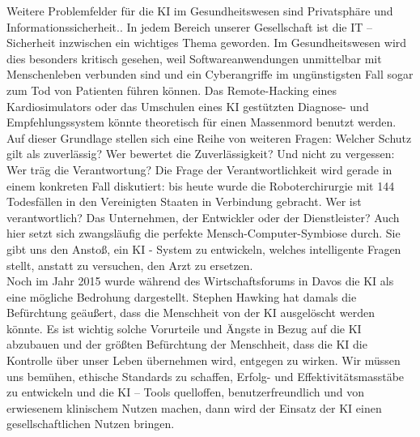 Weitere Problemfelder für die KI im Gesundheitswesen sind Privatsphäre und Informationssicherheit.\cite{Opportunities_challenges_ai_hc}. In jedem Bereich unserer Gesellschaft ist die IT – Sicherheit inzwischen ein wichtiges Thema geworden. Im Gesundheitswesen wird dies besonders kritisch gesehen, weil Softwareanwendungen unmittelbar mit Menschenleben verbunden sind und ein Cyberangriffe im ungünstigsten Fall sogar zum Tod von Patienten führen können. Das Remote-Hacking eines Kardiosimulators oder das Umschulen eines KI gestützten Diagnose- und Empfehlungssystem könnte theoretisch für einen Massenmord benutzt werden.\cite{Opportunities_challenges_ai_hc}\\ 
Auf dieser Grundlage stellen sich eine Reihe von weiteren Fragen: Welcher Schutz gilt als zuverlässig? Wer bewertet die Zuverlässigkeit? Und nicht zu vergessen: Wer träg die Verantwortung? 
Die Frage der Verantwortlichkeit wird gerade in einem konkreten Fall diskutiert: bis heute wurde die Roboterchirurgie mit 144 Todesfällen in den Vereinigten Staaten in Verbindung gebracht.\cite{Chapter_14} Wer ist verantwortlich? Das Unternehmen, der Entwickler oder der Dienstleister? Auch hier setzt sich zwangsläufig die perfekte Mensch-Computer-Symbiose durch. Sie gibt uns den Anstoß, ein KI - System zu entwickeln, welches intelligente Fragen stellt, anstatt zu versuchen, den Arzt zu ersetzen.\cite{Chapter_14}\\

Noch im Jahr 2015 wurde während des Wirtschaftsforums in Davos die KI als eine mögliche Bedrohung dargestellt.\cite{AI_in_medicine} Stephen Hawking hat damals die Befürchtung geäußert, dass die Menschheit von der KI ausgelöscht werden könnte.\cite{AI_in_medicine} Es ist wichtig solche Vorurteile und Ängste in Bezug auf die KI abzubauen und der größten Befürchtung der Menschheit, dass die KI die Kontrolle über unser Leben übernehmen wird, entgegen zu wirken. Wir müssen uns bemühen, ethische Standards zu schaffen, Erfolg- und Effektivitätsmasstäbe zu entwickeln und die KI – Tools quelloffen, benutzerfreundlich und von erwiesenem klinischem Nutzen machen, dann wird der Einsatz der KI einen gesellschaftlichen Nutzen bringen.\cite{AI_in_medicine} 
